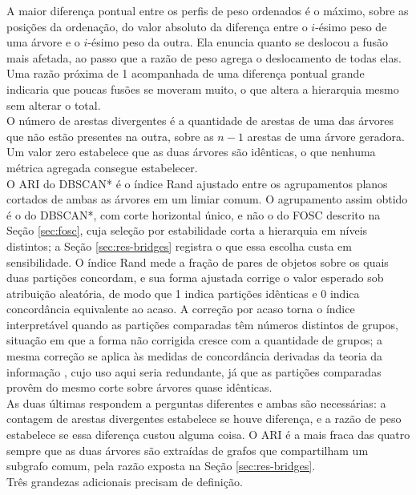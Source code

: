 A maior diferença pontual entre os perfis de peso ordenados é o máximo, sobre as posições da ordenação, do valor absoluto da diferença entre o $i$-ésimo peso de uma árvore e o $i$-ésimo peso da outra. Ela enuncia quanto se deslocou a fusão mais afetada, ao passo que a razão de peso agrega o deslocamento de todas elas. Uma razão próxima de 1 acompanhada de uma diferença pontual grande indicaria que poucas fusões se moveram muito, o que altera a hierarquia mesmo sem alterar o total.\\

O número de arestas divergentes é a quantidade de arestas de uma das árvores que não estão presentes na outra, sobre as $n-1$ arestas de uma árvore geradora. Um valor zero estabelece que as duas árvores são idênticas, o que nenhuma métrica agregada consegue estabelecer.\\

O \ac{ARI} do DBSCAN* \cite{ari} é o índice Rand ajustado entre os agrupamentos planos cortados de ambas as árvores em um limiar comum. O agrupamento assim obtido é o do DBSCAN*, com corte horizontal único, e não o do \ac{FOSC} descrito na Seção \ref{sec:fosc}, cuja seleção por estabilidade corta a hierarquia em níveis distintos; a Seção \ref{sec:res-bridges} registra o que essa escolha custa em sensibilidade. O índice Rand mede a fração de pares de objetos sobre os quais duas partições concordam, e sua forma ajustada corrige o valor esperado sob atribuição aleatória, de modo que 1 indica partições idênticas e 0 indica concordância equivalente ao acaso. A correção por acaso torna o índice interpretável quando as partições comparadas têm números distintos de grupos, situação em que a forma não corrigida cresce com a quantidade de grupos; a mesma correção se aplica às medidas de concordância derivadas da teoria da informação \cite{ami}, cujo uso aqui seria redundante, já que as partições comparadas provêm do mesmo corte sobre árvores quase idênticas.\\

As duas últimas respondem a perguntas diferentes e ambas são necessárias: a contagem de arestas divergentes estabelece se houve diferença, e a razão de peso estabelece se essa diferença custou alguma coisa. O \ac{ARI} é a mais fraca das quatro sempre que as duas árvores são extraídas de grafos que compartilham um subgrafo comum, pela razão exposta na Seção \ref{sec:res-bridges}.\\

Três grandezas adicionais precisam de definição.\\

